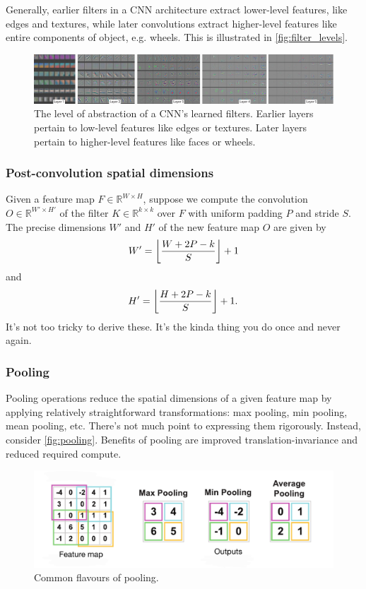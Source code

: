 \documentclass[11pt]{article}
\begin{document}
Generally, earlier filters in a CNN architecture extract lower-level features, like edges and textures, while later convolutions extract higher-level features like entire components of object, e.g. wheels. This is illustrated in \autoref{fig:filter_levels}.

\begin{figure}[t]
    \centering
    \includegraphics[width=\textwidth]{./figures/neural_nets/CNN_feature_levels.pdf}
    \caption{The level of abstraction of a CNN's learned filters. Earlier layers pertain to low-level features like edges or textures. Later layers pertain to higher-level features like faces or wheels.}
    \label{fig:filter_levels}
\end{figure}

\subsubsection*{Post-convolution spatial dimensions}
Given a feature map $F\in\mathbb{R}^{W\times H}$, suppose we compute the convolution $O\in\mathbb{R}^{W'\times H'}$ of the filter $K\in\mathbb{R}^{k\times k}$ over $F$ with uniform padding $P$ and stride $S$. The precise dimensions $W'$ and $H'$ of the new feature map $O$ are given by
$$
W'
=
\left\lfloor\frac{W+2P-k}{S}\right\rfloor+1
$$
and
$$
H'
=
\left\lfloor\frac{H+2P-k}{S}\right\rfloor+1.
$$
It's not too tricky to derive these. It's the kinda thing you do once and never again.

\subsubsection{Pooling}
Pooling operations reduce the spatial dimensions of a given feature map by applying relatively straightforward transformations: max pooling, min pooling, mean pooling, etc. There's not much point to expressing them rigorously. Instead, consider \autoref{fig:pooling}. Benefits of pooling are improved translation-invariance and reduced required compute.

\begin{figure}[ht]
    \centering
    \includegraphics[width=\textwidth]{./figures/neural_nets/CNN_pooling.pdf}
    \caption{Common flavours of pooling.}
    \label{fig:pooling}
\end{figure}
\end{document}
